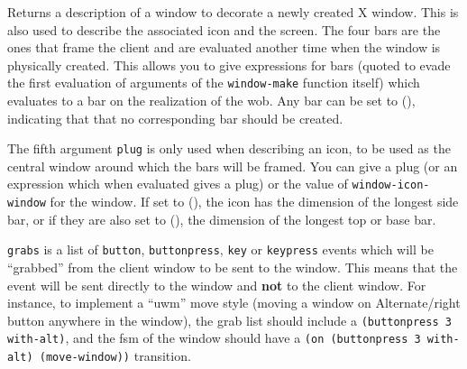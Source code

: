 \centerline{}

Returns a description of a {\GWM} window to decorate a newly created X
window. This is also used to describe the associated icon and the screen.
The four bars are the ones that frame the client and are evaluated
another time when the window is physically created. This allows you to give
expressions for bars (quoted to evade the first evaluation of arguments of
the \verb"window-make" function itself) which evaluates to a bar on the
realization of the wob.  Any bar can be set to (), indicating that that no
corresponding bar should be created.

The fifth argument \verb"plug" is only used when describing an icon, 
to be used as the central window
around which the bars will be framed. You can give a plug (or an expression
which when evaluated gives a plug) or the value of
\verb"window-icon-window" for the window. 
If set to (), the icon has
the dimension of the longest side bar, or if they are also set to (), the
dimension of the longest top or base bar.

\centerline{}


\verb"grabs" is a list of \verb"button", \verb"buttonpress", \verb"key" or
\verb"keypress"  events which will be ``grabbed'' from the client window to
be sent to the {\GWM} window. This means that the event will be sent
directly to the {\GWM} window and {\bf not} to the client window.  For
instance, to implement a ``uwm'' move style (moving a window on
Alternate/right button anywhere in the window), the grab list should include
a \verb"(buttonpress 3 with-alt)", and the fsm of the window should have a
\verb"(on (buttonpress 3 with-alt) (move-window))" transition.

